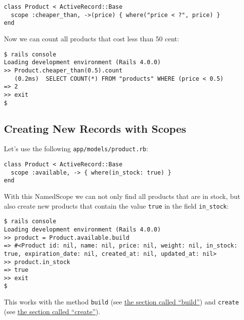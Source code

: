 \documentclass[a4paper]{book}
\begin{document}
\begin{shaded}\begin{verbatim}
class Product < ActiveRecord::Base
  scope :cheaper_than, ->(price) { where("price < ?", price) }
end
\end{verbatim}\end{shaded}

Now we can count all products that cost less than 50 cent:

\begin{shaded}\begin{verbatim}
$ rails console
Loading development environment (Rails 4.0.0)
>> Product.cheaper_than(0.5).count
   (0.2ms)  SELECT COUNT(*) FROM "products" WHERE (price < 0.5)
=> 2
>> exit
$
\end{verbatim}\end{shaded}

\subsection{Creating New Records with Scopes}\label{creating-new-records-with-scopes}

Let's use the following \texttt{app/models/product.rb}:

\begin{shaded}\begin{verbatim}
class Product < ActiveRecord::Base
  scope :available, -> { where(in_stock: true) }
end
\end{verbatim}\end{shaded}

With this NamedScope we can not only find all products that are in stock, but also create new products that contain the value \texttt{true} in the field \texttt{in\_stock}:

\begin{shaded}\begin{verbatim}
$ rails console
Loading development environment (Rails 4.0.0)
>> product = Product.available.build
=> #<Product id: nil, name: nil, price: nil, weight: nil, in_stock: true, expiration_date: nil, created_at: nil, updated_at: nil>
>> product.in_stock
=> true
>> exit
$
\end{verbatim}\end{shaded}

This works with the method \texttt{build} (see \hyperref[activerecordux5fhinzufuegenux5fbuild]{the section called “build”}) and \texttt{create} (see \hyperref[activerecordux5fcreate]{the section called “create”}).
\end{document}
